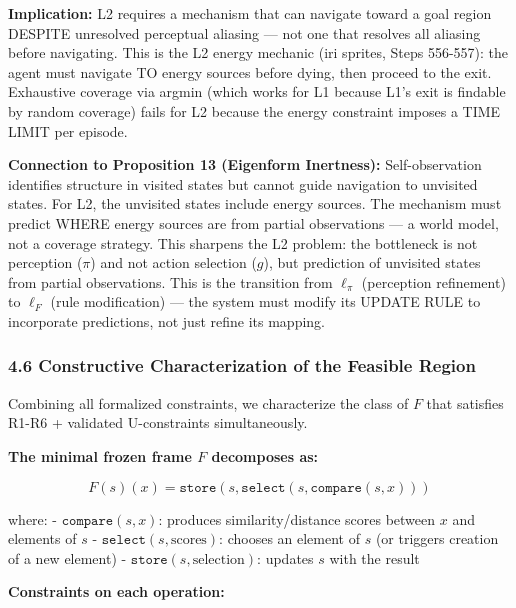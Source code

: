 \documentclass[
  11pt,
]{article}
\begin{document}
\textbf{Implication:} L2 requires a mechanism that can navigate toward a
goal region DESPITE unresolved perceptual aliasing --- not one that
resolves all aliasing before navigating. This is the L2 energy mechanic
(iri sprites, Steps 556-557): the agent must navigate TO energy sources
before dying, then proceed to the exit. Exhaustive coverage via argmin
(which works for L1 because L1's exit is findable by random coverage)
fails for L2 because the energy constraint imposes a TIME LIMIT per
episode.

\textbf{Connection to Proposition 13 (Eigenform Inertness):}
Self-observation identifies structure in visited states but cannot guide
navigation to unvisited states. For L2, the unvisited states include
energy sources. The mechanism must predict WHERE energy sources are from
partial observations --- a world model, not a coverage strategy. This
sharpens the L2 problem: the bottleneck is not perception (\(\pi\)) and
not action selection (\(g\)), but prediction of unvisited states from
partial observations. This is the transition from \(\ell_\pi\)
(perception refinement) to \(\ell_F\) (rule modification) --- the system
must modify its UPDATE RULE to incorporate predictions, not just refine
its mapping.

\subsubsection{4.6 Constructive Characterization of the Feasible
Region}\label{constructive-characterization-of-the-feasible-region}

Combining all formalized constraints, we characterize the class of \(F\)
that satisfies R1-R6 + validated U-constraints simultaneously.

\textbf{The minimal frozen frame \(F\) decomposes as:}

\[F(s)(x) = \texttt{store}(s, \texttt{select}(s, \texttt{compare}(s, x)))\]

where: - \(\texttt{compare}(s, x)\): produces similarity/distance scores
between \(x\) and elements of \(s\) -
\(\texttt{select}(s, \text{scores})\): chooses an element of \(s\) (or
triggers creation of a new element) -
\(\texttt{store}(s, \text{selection})\): updates \(s\) with the result

\textbf{Constraints on each operation:}
\end{document}
